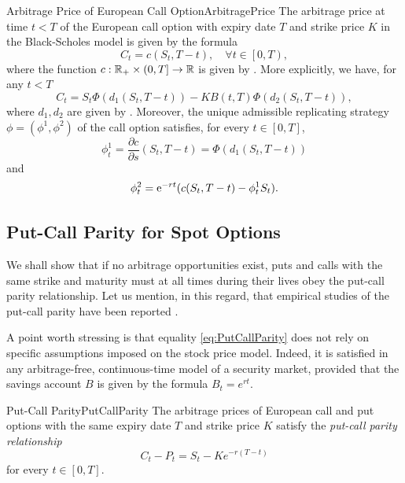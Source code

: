\begin{thm}{Arbitrage Price of European Call Option}{ArbitragePrice}
	The arbitrage price at time \(t < T\) of the European call option with expiry date \(T\) and strike price \(K\) in the Black-Scholes model is given by the formula
	\begin{equation}
		C_t = c(S_t, T - t), \quad \forall t \in \left[0, T\right),
		\label{eq:BsPrice}
	\end{equation}
	where the function \(c : \mathbb{R}_+ \times \left(0, T\right] \to \mathbb{R}\) is given by . More explicitly, we have, for any \(t < T\)
	\begin{equation*}
		C_t = S_t \Phi(d_1(S_t, T - t)) - K B(t, T) \Phi(d_2(S_t, T - t)),
	\end{equation*}
	where \(d_1, d_2\) are given by . Moreover, the unique admissible replicating strategy \(\phi = (\phi^1, \phi^2)\) of the call option satisfies, for every \(t \in [0, T]\),
	\begin{equation*}
		\phi^1_t = \frac{\partial c}{\partial s}(S_t, T - t) = \Phi(d_1(S_t, T - t))
	\end{equation*}
	and
	\begin{equation*}
		\phi^2_t = \mathrm{e}^{-rt} (c(S_t, T - t) - \phi^1_t S_t).
	\end{equation*}
\end{thm}



\subsection{Put-Call Parity for Spot Options}
We shall show that if no arbitrage opportunities exist, puts and calls with the same strike and maturity must at all times during their lives obey the put-call parity relationship. Let us mention, in this regard, that empirical studies of the put-call parity have been reported \citep{gouldTransactionsCostsRelationship1974,klemkoskyPutCallParityMarket1979}.

A point worth stressing is that equality \eqref{eq:PutCallParity} does not rely on specific assumptions imposed on the stock price model. Indeed, it is satisfied in any arbitrage-free, continuous-time model of a security market, provided that the savings account \(B\) is given by the formula \(B_t = e^{rt}\).

\begin{prop}{Put-Call Parity}{PutCallParity}
	The arbitrage prices of European call and put options with the same expiry date \(T\) and strike price \(K\) satisfy the \textit{put-call parity relationship}
	\begin{equation} \label{eq:PutCallParity}
		C_t - P_t = S_t - K e^{-r(T-t)}
	\end{equation}
	for every \(t \in [0, T]\).
\end{prop}

